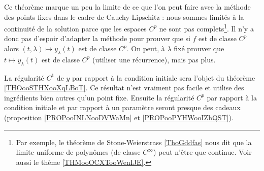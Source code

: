 \begin{normaltext}
    Ce théorème marque un peu la limite de ce que l'on peut faire avec la méthode des points fixes dans le cadre de Cauchy-Lipschitz : nous sommes limités à la continuité de la solution parce que les espaces \( C^p\) ne sont pas complets\footnote{Par exemple, le théorème de Stone-Weierstrass \ref{ThoGddfas} nous dit que la limite uniforme de polynômes (de classe \(  C^{\infty}\)) peut n'être que continue. Voir aussi le thème \ref{THMooOCXTooWenIJE}.}. Il n'y a donc pas d'espoir d'adapter la méthode pour prouver que si \( f\) est de classe \( C^p\) alors \( (t,\lambda)\mapsto y_{\lambda}(t)\) est de classe \( C^p\). On peut, à \( \lambda\) fixé prouver que \( t\mapsto y_{\lambda}(t)\) est de classe \( C^p\) (utiliser une récurrence), mais pas plus.

    La régularité \( C^1\) de \( y\) par rapport à la condition initiale sera l'objet du théorème \ref{THOooSTHXooXqLBoT}. Ce résultat n'est vraiment pas facile et utilise des ingrédients bien autres qu'un point fixe. Ensuite la régularité \( C^p\) par rapport à la condition initiale et par rapport à un paramètre seront presque des cadeaux (proposition \ref{PROPooINLNooDVWaMn} et \ref{PROPooPYHWooIZhQST}).
\end{normaltext}

